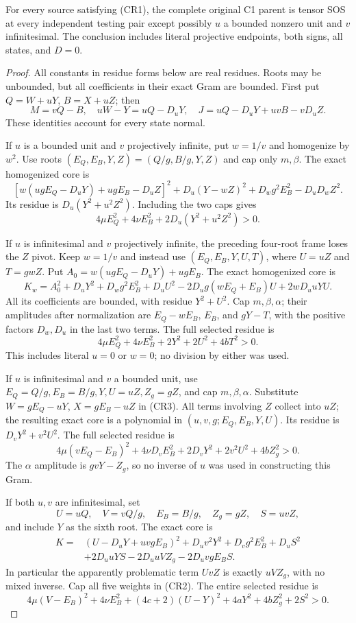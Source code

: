 \begin{theorem}
For every source satisfying (CR1), the complete original C1 parent
is tensor SOS at every independent testing pair except possibly
$u$ a bounded nonzero unit and $v$ infinitesimal. The conclusion
includes literal projective endpoints, both signs, all states,
and $D=0$.
\end{theorem}
\begin{proof}
All constants in residue forms below are real residues. Roots may be
unbounded, but all coefficients in their exact Gram are bounded.
First put $Q=W+uY$, $B=X+uZ$; then
\[
 M=vQ-B,\quad uW-Y=uQ-D_uY,\quad
 J=uQ-D_uY+uvB-vD_uZ.                               \tag{CR4}
\]
These identities account for every state normal.

If $u$ is a bounded unit and $v$ projectively infinite, put $w=1/v$
and homogenize by $w^2$. Use roots
$(E_Q,E_B,Y,Z)=(Q/g,B/g,Y,Z)$ and cap only $m,\beta$.
The exact homogenized core is
\[
 [w(ugE_Q-D_uY)+ugE_B-D_uZ]^2
 +D_u(Y-wZ)^2+D_wg^2E_B^2-D_uD_wZ^2.
\]
Its residue is $D_u(Y^2+u^2Z^2)$. Including the two caps gives
\[
 4\mu E_Q^2+4\nu E_B^2+2D_u(Y^2+u^2Z^2)>0.         \tag{CR5}
\]

If $u$ is infinitesimal and $v$ projectively infinite, the preceding
four-root frame loses the $Z$ pivot. Keep $w=1/v$ and instead use
$(E_Q,E_B,Y,U,T)$, where $U=uZ$ and $T=gwZ$. Put
$A_0=w(ugE_Q-D_uY)+ugE_B$. The exact homogenized core is
\[
 K_w=A_0^2+D_uY^2+D_wg^2E_B^2+D_uU^2
       -2D_ug(wE_Q+E_B)U+2wD_uuYU.
\]
All its coefficients are bounded, with residue $Y^2+U^2$.
Cap $m,\beta,\alpha$; their amplitudes after normalization are
$E_Q-wE_B$, $E_B$, and $gY-T$, with the positive factors
$D_w,D_u$ in the last two terms. The full selected residue is
\[
 4\mu E_Q^2+4\nu E_B^2+2Y^2+2U^2+4bT^2>0.       \tag{CR5a}
\]
This includes literal $u=0$ or $w=0$; no division by either was used.

If $u$ is infinitesimal and $v$ a bounded unit, use
$E_Q=Q/g,E_B=B/g,Y,U=uZ,Z_g=gZ$, and cap $m,\beta,\alpha$.
Substitute $W=gE_Q-uY$, $X=gE_B-uZ$ in (CR3).
All terms involving $Z$ collect into $uZ$; the resulting exact
core is a polynomial in $(u,v,g;E_Q,E_B,Y,U)$.
Its residue is $D_vY^2+v^2U^2$. The full selected residue is
\[
 4\mu(vE_Q-E_B)^2+4\nu D_vE_B^2
       +2D_vY^2+2v^2U^2+4bZ_g^2>0.                 \tag{CR6}
\]
The $\alpha$ amplitude is $gvY-Z_g$, so no inverse of $u$ was used
in constructing this Gram.

If both $u,v$ are infinitesimal, set
\[
 U=uQ,\quad V=vQ/g,\quad E_B=B/g,\quad Z_g=gZ,
 \quad S=uvZ,
\]
and include $Y$ as the sixth root. The exact core is
\begin{align*}
K={}&(U-D_uY+uvgE_B)^2+D_uv^2Y^2+D_vg^2E_B^2+D_uS^2\\
 &+2D_uuYS-2D_uuVZ_g-2D_uvgE_BS.                 \tag{CR7}
\end{align*}
In particular the apparently problematic term $UvZ$ is exactly
$uVZ_g$, with no mixed inverse. Cap all five weights in (CR2).
The entire selected residue is
\[
 4\mu(V-E_B)^2+4\nu E_B^2+(4c+2)(U-Y)^2
          +4aY^2+4bZ_g^2+2S^2>0.                  \tag{CR8}
\]


\end{proof}
